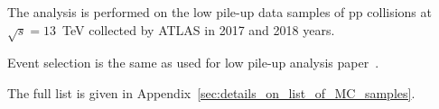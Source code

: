 
The analysis is performed on the low pile-up data samples of pp collisions at $\sqrt{s}=13$~TeV collected by ATLAS in 2017 and 2018 years.

Event selection is the same as used for low pile-up analysis paper~\cite{Kretzschmar:2657141}.

The full list is given in Appendix~\ref{sec:details_on_list_of_MC_samples}.





